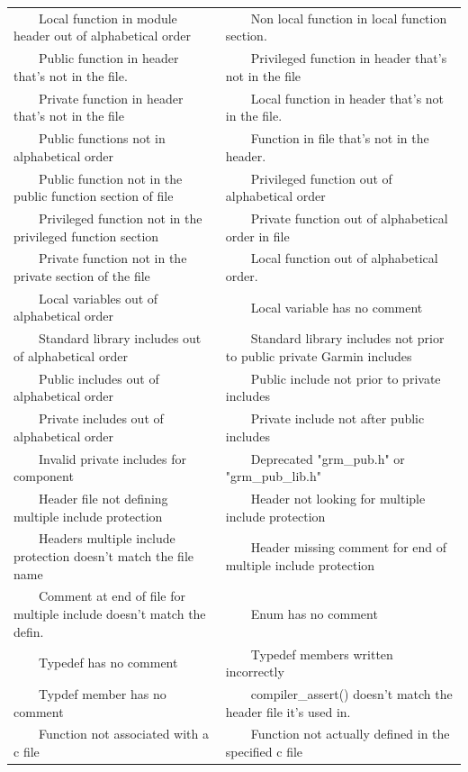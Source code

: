 \documentclass[11pt]{scrreprt}
\newcommand{\tabitem}{~~\llap{\textbullet}~~}
\begin{document}
\begin{longtable}{p{} p{}}
\tabitem Local function in module header out of alphabetical order & \tabitem Non local function in local function section.\\
\tabitem Public function in header that's not in the file. & \tabitem Privileged function in header that's not in the file\\
\tabitem Private function in header that's not in the file & \tabitem Local function in header that's not in the file.\\
\tabitem Public functions not in alphabetical order & \tabitem Function in file that's not in the header.\\
\tabitem Public function not in the public function section of file & \tabitem Privileged function out of alphabetical order\\
\tabitem Privileged function not in the privileged function section & \tabitem Private function out of alphabetical order in file\\
\tabitem Private function not in the private section of the file & \tabitem Local function out of alphabetical order.\\
\tabitem Local variables out of alphabetical order & \tabitem Local variable has no comment\\
\tabitem Standard library includes out of alphabetical order & \tabitem Standard library includes not prior to public private Garmin includes\\
\tabitem Public includes out of alphabetical order & \tabitem Public include not prior to private includes\\
\tabitem Private includes out of alphabetical order & \tabitem Private include not after public includes\\
\tabitem Invalid private includes for component & \tabitem Deprecated "grm\_pub.h" or "grm\_pub\_lib.h"\\
\tabitem Header file not defining multiple include protection & \tabitem Header not looking for multiple include protection\\
\tabitem Headers multiple include protection doesn't match the file name & \tabitem Header missing comment for end of multiple include protection\\
\tabitem Comment at end of file for multiple include doesn't match the defin. & \tabitem Enum has no comment\\
\tabitem Typedef has no comment & \tabitem Typedef members written incorrectly\\
\tabitem Typdef member has no comment & \tabitem compiler\_assert() doesn't match the header file it's used in.\\
\tabitem Function not associated with a c file & \tabitem Function not actually defined in the specified c file\\
\end{longtable}
\end{document}
